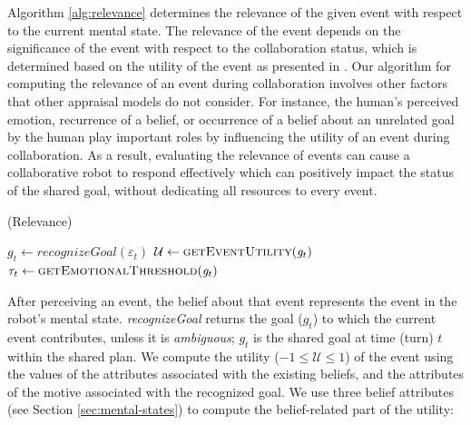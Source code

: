 \documentclass{article}
\begin{document}
Algorithm \ref{alg:relevance} determines the relevance of the given event with
respect to the current mental state. The relevance of the event depends on the
significance of the event with respect to the collaboration status, which is
determined based on the utility of the event as presented in
\cite{gratch:domain-independent,marsella:ema-process-model}. Our algorithm for
computing the relevance of an event during collaboration involves other factors
that other appraisal models do not consider. For instance, the human's
perceived emotion, recurrence of a belief, or occurrence of a belief about an
unrelated goal by the human play important roles by influencing the utility
of an event during collaboration. As a result, evaluating the relevance of
events can cause a collaborative robot to respond effectively which can
positively impact the status of the shared goal, without dedicating all
resources to every event.

\begin{algorithm}
	\caption{(Relevance)}
	\label{alg:relevance}
	\begin{algorithmic}[1]
			\State $\mathit{g}_{t} \gets \textit{recognizeGoal}{(\varepsilon_t)}$
			\State $\mathcal{U} \gets \Call{getEventUtility}{\mathit{g}_{t}}$ 
			\State $\tau_{t} \gets \Call{getEmotionalThreshold}{\mathit{g}_{t}}$
				\State {}
			\Else
				\State {}
			\EndIf
		\EndFunction
	\end{algorithmic}
\end{algorithm}

\vspace*{-3mm}
After perceiving an event, the belief about that event represents the event in
the robot's mental state. \textit{recognizeGoal} returns the goal ($g_{t}$) to
which the current event contributes, unless it is \textit{ambiguous}; $g_{t}$
is the shared goal at time (turn) $t$ within the shared plan. We compute the
utility ($-1 \leq \mathcal{U} \leq 1$) of the event using the values of the
attributes associated with the existing beliefs, and the attributes of the
motive associated with the recognized goal. We use three belief attributes (see
Section \ref{sec:mental-states}) to compute the belief-related part of the
utility:
\end{document}
